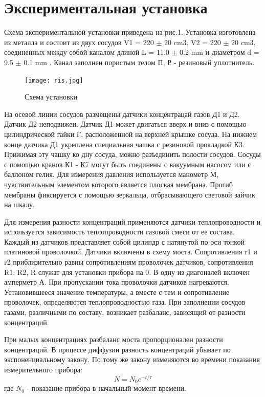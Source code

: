 \documentclass[a4paper,12pt]{article}
\begin{document}
\section{Экспериментальная установка}

Схема экспериментальной установки приведена на рис.1. Установка изготовлена из металла и состоит из двух сосудов V1 = 220 $\pm $ 20 cm3, V2 = 220 $\pm $ 20 cm3, соединенных между собой каналом длиной L = 11.0 $\pm $ 0.2 mm и диаметром d = 9.5 $\pm $  0.1 mm . Канал заполнен пористым телом П, Р - резиновый уплотнитель.

\begin{figure}[H]
  \begin{center}
    \texttt{[image: ris.jpg]}
    \caption{Схема установки}
    \label{fig:}
  \end{center}
\end{figure}

На осевой линии сосудов размещены датчики концентрацай газов Д1 и Д2. Датчик Д2 неподвижен. Датчик Д1 может двигаться вверх и вниз с помощью цилиндрической гайки Г, расположенной на верхней крышке сосуда. На нижнем конце датчика Д1 укреплена специальная чашка с резиновой прокладкой К3. Прижимая эту чашку ко дну сосуда, можно разъединить полости сосудов. Сосуды с помощью кранов К1 - К7 могут быть соединены с вакуумным насосом или с баллоном гелия. Для измерения давления используется манометр М, чувствительным элементом которого является плоская мембрана. Прогиб мембраны фиксируется с помощью зеркальца, отбрасывающего световой зайчик на шкалу.

Для измерения разности концентраций применяются датчики теплопроводности и используется зависимость теплопроводности газовой смеси от ее состава. Каждый из датчиков представляет собой цилиндр с натянутой по оси тонкой платиновой проволочкой. Датчики включены в схему моста. Сопротивления r1 и r2 приблизительно равны сопротивлениям проволочек датчиков, сопротивления R1, R2, R служат для установки прибора на 0. В  одну из диагоналей включен амперметр А. При пропускании тока проволочки датчиков нагреваются. Установившееся значение температуры, а вместе с тем и сопротивление проволочек, определяются теплопроводностью газа. При заполнении сосудов газами, различными по составу, возникает разбаланс, зависящий от разности концентраций.

При малых концентрациях разбаланс моста пропорционален разности концентраций. В процессе диффузии разность концентраций убывает по экспоненциальному закону. По тому же закону изменяются во времени показания измерительного прибора:
\[ N = N_{0}e^{-t/\tau } \]
где $N_0$ - показание прибора в начальный момент времени.
\end{document}
